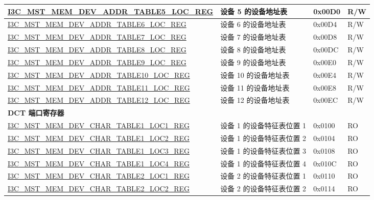 \begin{longtable}{ | p{8cm} | p{5.5cm} | p{1.3cm} | p{1cm} | }
\hyperref[regdesc:I3CMSTMEMDEVADDRTABLENLOCREG]{I3C\_MST\_MEM\_DEV\_ADDR\_TABLE5\_LOC\_REG} & 设备 5 的设备地址表 & 0x00D0 & R/W \\ \hline
\hyperref[regdesc:I3CMSTMEMDEVADDRTABLENLOCREG]{I3C\_MST\_MEM\_DEV\_ADDR\_TABLE6\_LOC\_REG} & 设备 6 的设备地址表 & 0x00D4 & R/W \\ \hline
\hyperref[regdesc:I3CMSTMEMDEVADDRTABLENLOCREG]{I3C\_MST\_MEM\_DEV\_ADDR\_TABLE7\_LOC\_REG} & 设备 7 的设备地址表 & 0x00D8 & R/W \\ \hline
\hyperref[regdesc:I3CMSTMEMDEVADDRTABLENLOCREG]{I3C\_MST\_MEM\_DEV\_ADDR\_TABLE8\_LOC\_REG} & 设备 8 的设备地址表 & 0x00DC & R/W \\ \hline
\hyperref[regdesc:I3CMSTMEMDEVADDRTABLENLOCREG]{I3C\_MST\_MEM\_DEV\_ADDR\_TABLE9\_LOC\_REG} & 设备 9 的设备地址表 & 0x00E0 & R/W \\ \hline
\hyperref[regdesc:I3CMSTMEMDEVADDRTABLENLOCREG]{I3C\_MST\_MEM\_DEV\_ADDR\_TABLE10\_LOC\_REG} & 设备 10 的设备地址表 & 0x00E4 & R/W \\ \hline
\hyperref[regdesc:I3CMSTMEMDEVADDRTABLENLOCREG]{I3C\_MST\_MEM\_DEV\_ADDR\_TABLE11\_LOC\_REG} & 设备 11 的设备地址表 & 0x00E8 & R/W \\ \hline
\hyperref[regdesc:I3CMSTMEMDEVADDRTABLENLOCREG]{I3C\_MST\_MEM\_DEV\_ADDR\_TABLE12\_LOC\_REG} & 设备 12 的设备地址表 & 0x00EC & R/W \\ \hline
\multicolumn{4}{|l|}{\textbf{DCT 端口寄存器}} \\ \hline
\hyperref[regdesc:I3CMSTMEMDEVCHARTABLENLOCMREG]{I3C\_MST\_MEM\_DEV\_CHAR\_TABLE1\_LOC1\_REG} & 设备 1 的设备特征表位置 1 & 0x0100 & RO \\ \hline
\hyperref[regdesc:I3CMSTMEMDEVCHARTABLENLOCMREG]{I3C\_MST\_MEM\_DEV\_CHAR\_TABLE1\_LOC2\_REG} & 设备 1 的设备特征表位置 2 & 0x0104 & RO \\ \hline
\hyperref[regdesc:I3CMSTMEMDEVCHARTABLENLOCMREG]{I3C\_MST\_MEM\_DEV\_CHAR\_TABLE1\_LOC3\_REG} & 设备 1 的设备特征表位置 3 & 0x0108 & RO \\ \hline
\hyperref[regdesc:I3CMSTMEMDEVCHARTABLENLOCMREG]{I3C\_MST\_MEM\_DEV\_CHAR\_TABLE1\_LOC4\_REG} & 设备 1 的设备特征表位置 4 & 0x010C & RO \\ \hline
\hyperref[regdesc:I3CMSTMEMDEVCHARTABLENLOCMREG]{I3C\_MST\_MEM\_DEV\_CHAR\_TABLE2\_LOC1\_REG} & 设备 2 的设备特征表位置 1 & 0x0110 & RO \\ \hline
\hyperref[regdesc:I3CMSTMEMDEVCHARTABLENLOCMREG]{I3C\_MST\_MEM\_DEV\_CHAR\_TABLE2\_LOC2\_REG} & 设备 2 的设备特征表位置 2 & 0x0114 & RO \\ \hline

\end{longtable}

